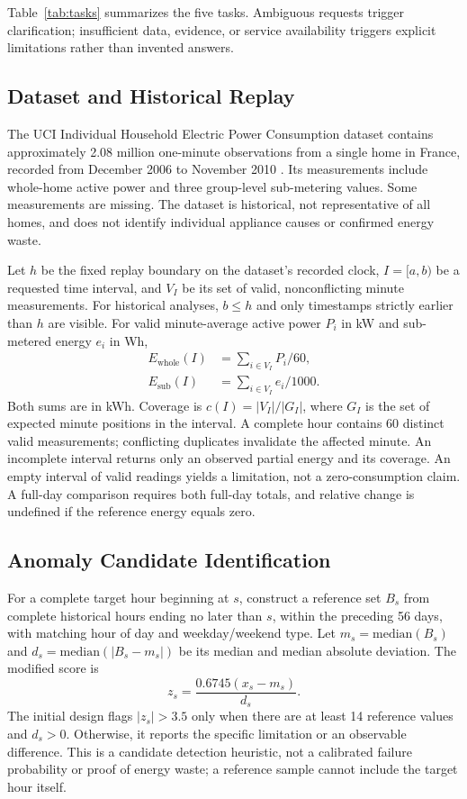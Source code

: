 \documentclass[conference]{IEEEtran}
\begin{document}
Table~\ref{tab:tasks} summarizes the five tasks. Ambiguous requests trigger clarification; insufficient data, evidence, or service availability triggers explicit limitations rather than invented answers.

\subsection{Dataset and Historical Replay}
The UCI Individual Household Electric Power Consumption dataset contains approximately 2.08 million one-minute observations from a single home in France, recorded from December 2006 to November 2010 \cite{uci2006}. Its measurements include whole-home active power and three group-level sub-metering values. Some measurements are missing. The dataset is historical, not representative of all homes, and does not identify individual appliance causes or confirmed energy waste.

Let $h$ be the fixed replay boundary on the dataset's recorded clock, $I=[a,b)$ be a requested time interval, and $V_I$ be its set of valid, nonconflicting minute measurements. For historical analyses, $b\le h$ and only timestamps strictly earlier than $h$ are visible. For valid minute-average active power $P_i$ in kW and sub-metered energy $e_i$ in Wh,
\begin{align}
E_{\mathrm{whole}}(I)&=\sum_{i\in V_I}P_i/60,\label{eq:whole}\\
E_{\mathrm{sub}}(I)&=\sum_{i\in V_I}e_i/1000.\label{eq:sub}
\end{align}
Both sums are in kWh. Coverage is $c(I)=|V_I|/|G_I|$, where $G_I$ is the set of expected minute positions in the interval. A complete hour contains 60 distinct valid measurements; conflicting duplicates invalidate the affected minute. An incomplete interval returns only an observed partial energy and its coverage. An empty interval of valid readings yields a limitation, not a zero-consumption claim. A full-day comparison requires both full-day totals, and relative change is undefined if the reference energy equals zero.

\subsection{Anomaly Candidate Identification}
For a complete target hour beginning at $s$, construct a reference set $B_s$ from complete historical hours ending no later than $s$, within the preceding 56 days, with matching hour of day and weekday/weekend type. Let $m_s=\mathrm{median}(B_s)$ and $d_s=\mathrm{median}(|B_s-m_s|)$ be its median and median absolute deviation. The modified score \cite{nistoutlier} is
\begin{equation}
 z_s=\frac{0.6745(x_s-m_s)}{d_s}.
\end{equation}
The initial design flags $|z_s|>3.5$ only when there are at least 14 reference values and $d_s>0$. Otherwise, it reports the specific limitation or an observable difference. This is a candidate detection heuristic, not a calibrated failure probability or proof of energy waste; a reference sample cannot include the target hour itself.
\end{document}
